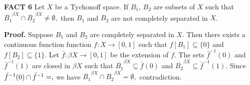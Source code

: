 \documentclass{article}
\begin{document}
\textbf{FACT 6} Let $X$ be a Tychonoff space. If $B_1$, $B_2$ are subsets of $X$ such that $\overline{B_1}^{\beta X} \cap \overline{B_2}^{\beta X} \neq \emptyset,$ then $B_1$ and $B_2$ are not completely separated in $X$. 


\vskip 15pt


\textbf{Proof.} Suppose $B_1$ and $B_2$ are completely separated in $X$. Then there exists a continuous function function $f:X\rightarrow [0,1]$ such that 
$f\left[B_1\right] \subseteq\{0\}$ and $f\left[B_2\right]\subseteq \{1\}.$ Let $\bar{f}: \beta X\rightarrow [0,1]$ be the extension of $f$. The sets $\bar{f}^{-1}(0)$ and $\bar{f}^{-1}(1)$ are closed in $\beta X$ such that $\overline{B_1}^{\beta X} \subseteq \bar{f}(0)$ and $\overline{B_2}^{\beta X} \subseteq \bar{f}^{-1}(1).$ Since $\bar{f}^{-1}(0)\cap\bar{f}^{-1}=\empty,$ we have $\overline{B_1}^{\beta X}\cap \overline{B_2}^{\beta X}=\emptyset,$ contradiction. 
\end{document}
